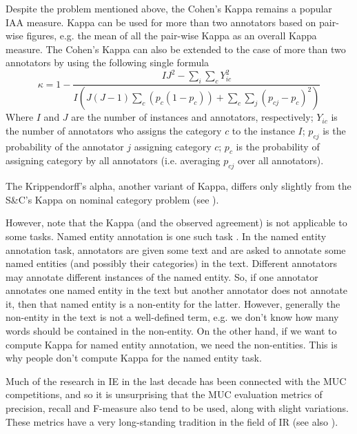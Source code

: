 Despite the problem mentioned above, the Cohen's Kappa remains a popular IAA measure. 
Kappa can be used for more than two annotators based on pair-wise figures, e.g. the mean
of all the pair-wise Kappa as an overall Kappa measure. The Cohen's Kappa can also be
extended to the case of more than two annotators by using the following single 
formula  \cite{Davies82}
\begin{equation}
\kappa = 1-\frac{IJ^{2}-\sum_{i}\sum_{c}Y_{ic}^{2}}
{I(J(J-1)\sum_{c}(p_{c}(1-p_{c}))+ \sum_{c}\sum_{j}(p_{cj}-p_{c})^2)}
\end{equation}
Where $I$ and $J$ are the number of instances and annotators, respectively; $Y_{ic}$ 
is the number of annotators who assigns the category $c$ to the instance $I$; $p_{cj}$ 
is the probability of the annotator $j$ assigning category $c$; $p_{c}$ is the 
probability of assigning category by all annotators (i.e. averaging $p_{cj}$  
over all annotators).

The Krippendorff's alpha, another variant of Kappa, differs only slightly from
the S\&C's Kappa on nominal category problem (see \cite{Carletta96, Eugenio04}).

However, note that the Kappa (and the observed agreement) is not applicable to some
tasks. Named entity annotation is  one such task
\cite{Hripcsak05}. In the named entity annotation task, annotators are given 
some text and are asked to annotate some named entities (and possibly their 
categories) in the text. Different annotators may annotate different instances
of the named entity. So, if one annotator annotates one named entity in the text but
another annotator does not annotate it, then that named entity is a non-entity
for the latter. However, generally the non-entity in the text is not a well-defined 
term, e.g. we don't know how many words should be contained in the non-entity. On the 
other hand, if we want to compute Kappa for named entity annotation, we need
the non-entities. This is why people don't compute Kappa for the named entity task.


Much of the research in IE in the last decade has been connected with
the MUC competitions, and so it is unsurprising that the MUC
evaluation metrics of precision, recall and F-measure
\cite{Chinchor92} also tend to be used, along with slight
variations. These metrics have a very long-standing tradition in the
field of IR \cite{van79} (see also \cite{Man99,Fra92}).

